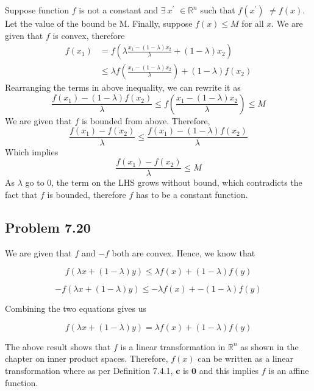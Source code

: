 \documentclass[letterpaper,12pt]{article}
\theoremstyle{definition}
\begin{document}
Suppose function $f$ is not a constant and $\exists\ x^'$ $\in \mathbb{R}^n$ such that $f (x^')$ $\ne f(x)$. Let the value of the bound be M. Finally, suppose $f(x) \leq M$ for all $x$. We are given that $f$ is convex, therefore
	\begin{align*}
	f(x_1) &= f\left(\lambda \frac{x_1 - (1 - \lambda)x_2}{\lambda} + (1 - \lambda)x_2\right) \\
	&\leq \lambda  f\left(\frac{x_1 - (1 - \lambda)x_2}{\lambda}\right)+ (1 - \lambda)f(x_2)
	\end{align*}
	Rearranging the terms in above inequality, we can rewrite it as 
	\begin{equation}
	\frac{f(x_1) - (1 - \lambda) f(x_2)}{\lambda} \leq f\left(\frac{x_1 - (1 - \lambda)x_2}{\lambda}\right) \leq M
	\end{equation}
	We are given that  $f$ is bounded from above. Therefore,
	\begin{equation}
	\frac{f(x_1) - f(x_2)}{\lambda} \leq \frac{f(x_1) - (1 - \lambda) f(x_2)}{\lambda}
	\end{equation}
	Which implies
	\begin{equation}
	\frac{f(x_1) - f(x_2)}{\lambda} \leq  M
	\end{equation}
	As $\lambda$ go to $0$, the term on the LHS grows without bound, which contradicts the fact that $f$ is bounded, therefore $f$ has to be a constant function. 



\subsection*{Problem 7.20}

We are given that $f$ and $-f$ both are convex. Hence, we know that

\begin{equation*}
    f(\lambda x + (1-\lambda) y) \leq \lambda f(x) + (1-\lambda)f(y)
\end{equation*}

\begin{equation*}
    -f(\lambda x + (1-\lambda) y) \leq -\lambda f(x) + -(1-\lambda)f(y)
\end{equation*}
\begin{flushleft}
Combining the two equations gives us 
\end{flushleft}
\begin{equation*}
    f(\lambda x + (1-\lambda) y) = \lambda f(x) + (1-\lambda)f(y)
\end{equation*}
\begin{flushleft}
The above result shows that $f$ is a linear transformation in $\mathbb{R}^n$ as shown in the chapter on inner product spaces. Therefore, $f(x)$ can be written as a linear transformation where as per Definition 7.4.1, $\textbf{c}$ is $\textbf{0}$ and this implies $f$ is an affine function.
\end{flushleft}
\end{document}
